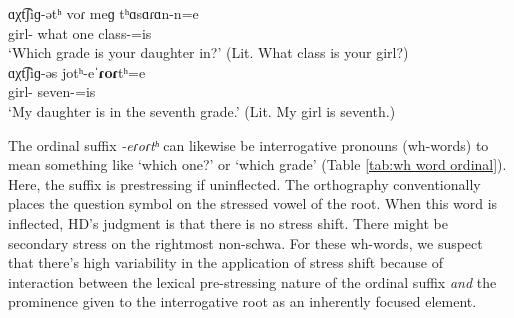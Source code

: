 \begin{exe}
	\ex \label{ex:stress:prestress:ord sentece more school}
	\begin{xlist}
		\ex \gll ɑχt͡ʃiɡ-ətʰ voɾ meɡ tʰɑsɑɾɑn-n=e
		\\
		girl-{\possSsg} what one class-{}=is
		\\
		\trans `Which grade is your daughter in?' (Lit. What class is your girl?)
		\\
		\ex \gll ɑχt͡ʃiɡ-əs jotʰ-eˈ\textbf{ɾoɾ}tʰ=e
		\\
		girl-{\possFsg} seven-{\ord}=is
		\\
		\trans `My daughter is in the seventh grade.'  (Lit. My girl is seventh.)
		\\
	\end{xlist}
	
	
\end{exe}



The ordinal suffix \textit{-eɾoɾtʰ} can likewise be interrogative pronouns (wh-words) to mean something like `which one?' or `which grade' (Table \ref{tab:wh word ordinal}). Here, the suffix is prestressing if uninflected. The orthography conventionally places the question symbol  on the stressed vowel of the  root.  When this word is inflected, HD's judgment  is that there is no stress shift. There might be secondary stress on the rightmost non-schwa. For these wh-words, we suspect that there's high variability in the application of stress shift because of interaction between the lexical pre-stressing nature of the ordinal suffix \textit{and} the prominence given to the interrogative root as an inherently focused element.  

